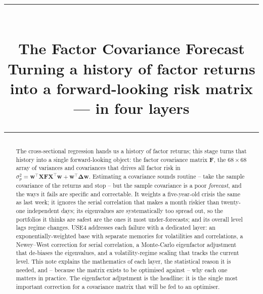 \documentclass[11pt]{article}
\title{\vspace{-2.2em}
  {\color{steel}\rule{\textwidth}{1.3pt}}\\[0.7em]
  \Huge\bfseries The Factor Covariance Forecast\\[0.35em]
  \large\mdseries Turning a history of factor returns into a forward-looking risk matrix --- in four layers\\[0.4em]
  {\color{steel}\rule{\textwidth}{0.7pt}}}
\author{}
\date{}
\theoremstyle{definition}
\theoremstyle{plain}
\theoremstyle{remark}
\newcommand{\T}{^{\!\top}}
\newcommand{\wvec}{\mathbf{w}}
\newcommand{\Xmat}{\mathbf{X}}
\newcommand{\Fmat}{\mathbf{F}}
\newcommand{\Del}{\boldsymbol{\Delta}}
\begin{document}
\maketitle
\thispagestyle{empty}

\begin{abstract}
The cross-sectional regression hands us a history of factor returns; this stage turns that history into a single forward-looking object: the factor covariance matrix $\Fmat$, the $68\times68$ array of variances and covariances that drives all factor risk in $\sigma_p^2 = \wvec\T\Xmat\Fmat\Xmat\T\wvec + \wvec\T\Del\wvec$. Estimating a covariance sounds routine -- take the sample covariance of the returns and stop -- but the sample covariance is a poor \emph{forecast}, and the ways it fails are specific and correctable. It weights a five-year-old crisis the same as last week; it ignores the serial correlation that makes a month riskier than twenty-one independent days; its eigenvalues are systematically too spread out, so the portfolios it thinks are safest are the ones it most under-forecasts; and its overall level lags regime changes. USE4 addresses each failure with a dedicated layer: an exponentially-weighted base with separate memories for volatilities and correlations, a Newey--West correction for serial correlation, a Monte-Carlo eigenfactor adjustment that de-biases the eigenvalues, and a volatility-regime scaling that tracks the current level. This note explains the mathematics of each layer, the statistical reason it is needed, and -- because the matrix exists to be optimised against -- why each one matters in practice. The eigenfactor adjustment is the headline: it is the single most important correction for a covariance matrix that will be fed to an optimiser.
\end{abstract}
\end{document}
